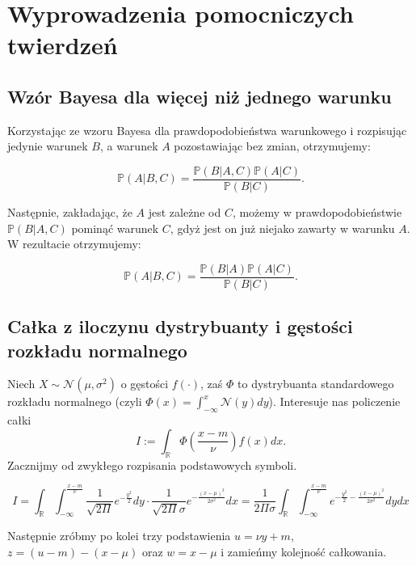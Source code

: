 \documentclass{mini}
\begin{document}


\appendix

\chapter{Wyprowadzenia pomocniczych twierdzeń}

\section{Wzór Bayesa dla więcej niż jednego warunku}\label{app1}

Korzystając ze wzoru Bayesa dla prawdopodobieństwa warunkowego i rozpisując jedynie warunek $B$, a warunek $A$ pozostawiając bez zmian, otrzymujemy:

$$
\mathbb{P}(A | B, C) 
=
\frac{
\mathbb{P}(B | A, C)
\mathbb{P}(A | C)
}{
\mathbb{P}(B | C)
}. 
$$

Następnie, zakładając, że $A$ jest zależne od $C$, możemy w prawdopodobieństwie $\mathbb{P}(B | A, C)$ pominąć warunek $C$, gdyż jest on już niejako zawarty w warunku $A$. W rezultacie otrzymujemy:

$$
\mathbb{P}(A | B, C) 
=
\frac{
\mathbb{P}(B | A)
\mathbb{P}(A | C)
}{
\mathbb{P}(B | C)
}. 
$$

\section{Całka z iloczynu dystrybuanty i gęstości rozkładu normalnego}\label{app2}

Niech $X \sim \mathcal{N}(\mu, \sigma^2)$ o gęstości $f(\cdot)$, zaś $\Phi$ to dystrybuanta standardowego rozkładu normalnego (czyli $\Phi(x)=\int_{-\infty}^x \mathcal{N}(y) dy$). Interesuje nas policzenie całki
$$
I := \int_\mathbb{R} \Phi(\frac{x-m}{\nu})f(x) dx.
$$
Zacznijmy od zwykłego rozpisania podstawowych symboli.

$$
I = \int_\mathbb{R}\int_{-\infty}^{\frac{x-m}{\nu}} \frac{1}{\sqrt{2\Pi}}e^{-\frac{y^2}{2}} dy \cdot \frac{1}{\sqrt{2\Pi}\sigma}e^{-\frac{(x-\mu)^2}{2\sigma^2}} dx
= 
\frac{1}{2\Pi\sigma}\int_\mathbb{R}\int_{-\infty}^{\frac{x-m}{\nu}} e^{-\frac{y^2}{2} - \frac{(x-\mu)^2}{2\sigma^2}} dy dx
$$

Następnie zróbmy po kolei trzy podstawienia $u = \nu y+m$, $z=(u-m)-(x-\mu)$ oraz $w=x-\mu$ i zamieńmy kolejność całkowania. 
\end{document}
